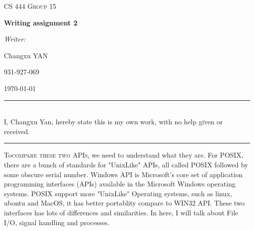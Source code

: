 \documentclass[10pt,draftclsnofoot,onecolumn,journal,compsoc]{IEEEtran}
\def\name{Changxu Yan}
\begin{document}
\begin{titlepage}
\begin{center}
    \vfill
    \textsc{\LARGE CS 444 Group 15}\par
    \vspace{1cm}
    { \huge \bfseries Writing assignment 2 \par}
    \vfill
    \emph{Writer:}\par
    Changxu \textsc{YAN}\par
    \vspace{1cm}
    931-927-069 \par
    \vfill
    {\large \today\par}
\end{center}
\end{titlepage}

\noindent\rule{15.5cm}{0.4pt}
\\
I, \name, hereby state this is my own work, with no help given or received.\\
\noindent\rule{15.5cm}{0.4pt}
\par
\lettrine{To}{compare these two APIs,} we need to understand what they are. For POSIX, there are a bunch of standards for "UnixLike" APIs, all called POSIX followed by some obscure serial number. Windows API is Microsoft's core set of application programming interfaces (APIs) available in the Microsoft Windows operating systems. POSIX support more "UnixLike" Operating systems, such as linux, ubontu and MacOS, it has better portablity compare to WIN32 API. These two interfaces has lots of differences and similarities. In here, I will talk about File I/O, signal handling and processes.\cite{Love} \par
\end{document}
